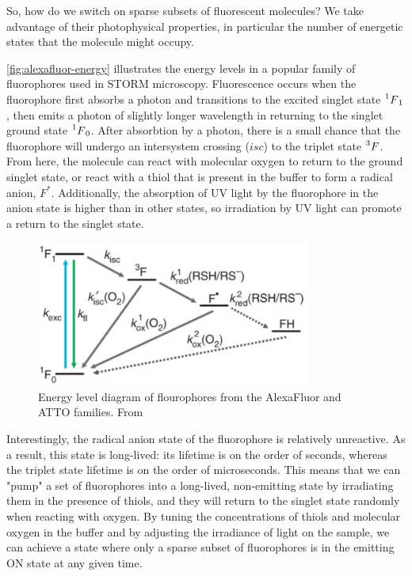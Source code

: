\documentclass[10pt,a4paper,oneside]{book}
\begin{document}
So, how do we switch on sparse subsets of fluorescent molecules? We take advantage of their photophysical properties, in particular the number of energetic states that the molecule might occupy.

\autoref{fig:alexafluor-energy} illustrates the energy levels in a popular family of fluorophores used in STORM microscopy. Fluorescence occurs when the fluorophore first absorbs a photon and transitions to the excited singlet state $\prescript{1}{}F_1$, then emits a photon of slightly longer wavelength in returning to the singlet ground state $\prescript{1}{}F_0$. After absorbtion by a photon, there is a small chance that the fluorophore will undergo an intersystem crossing ($isc$) to the triplet state $\prescript{3}{}F$. From here, the molecule can react with molecular oxygen to return to the ground singlet state, or react with a thiol that is present in the buffer to form a radical anion, $F^*$. Additionally, the absorption of UV light by the fluorophore in the anion state is higher than in other states, so irradiation by UV light can promote a return to the singlet state.

\begin{figure}[ht]
    \centering
    \includegraphics[width=0.8\textwidth]{alexafluor-jablonski-diagram.png}
    \caption{Energy level diagram of flourophores from the AlexaFluor and ATTO families. From \cite{vandelinde-natureprotocols-2011}}
    \label{fig:alexafluor-energy}
\end{figure}

Interestingly, the radical anion state of the fluorophore is relatively unreactive. As a result, this state is long-lived: its lifetime is on the order of seconds, whereas the triplet state lifetime is on the order of microseconds. This means that we can "pump" a set of fluorophores into a long-lived, non-emitting state by irradiating them in the presence of thiols, and they will return to the singlet state randomly when reacting with oxygen. By tuning the concentrations of thiols and molecular oxygen in the buffer and by adjusting the irradiance of light on the sample, we can achieve a state where only a sparse subset of fluorophores is in the emitting ON state at any given time.
\end{document}
